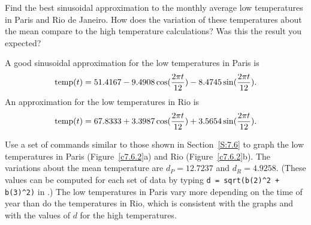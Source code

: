 \documentclass{ximera}
\begin{document}
\begin{computerExercise} \label{c7.6.2}
Find the best sinusoidal approximation to the monthly average low temperatures
in Paris and Rio de Janeiro.  How does the variation of these temperatures
about the mean compare to the high temperature calculations?  Was this the
result you expected?

\begin{solution}

\ans A good sinusoidal approximation for the low temperatures in Paris
is 
\[ \hbox{temp}(t) = 51.4167 - 9.4908\cos(\frac{2\pi t}{12}) -
8.4745\sin(\frac{2\pi t}{12}). \]
An approximation for the low temperatures in Rio is
\[ \hbox{temp}(t) = 67.8333 + 3.3987\cos(\frac{2\pi t}{12}) +
3.5654\sin(\frac{2\pi t}{12}). \]

\soln Use a set of \Matlab commands similar to those shown in
Section~\ref{S:7.6} to graph the low temperatures in Paris
(Figure~\ref{c7.6.2}a) and Rio (Figure~\ref{c7.6.2}b).  The
variations about the mean temperature are $d_P = 12.7237$ and
$d_R = 4.9258$.  (These values can be computed for each set of data
by typing {\tt d = sqrt(b(2)\^{}2 + b(3)\^{}2)} in \Matlabp.) 
The low temperatures in Paris vary more depending on the time of
year than do the temperatures in Rio, which is consistent with
the graphs and with the values of $d$ for the high temperatures.

\begin{figure}[htb]
		\centerline{%
		}
\end{figure}

\end{solution}
\end{computerExercise}
\end{document}

